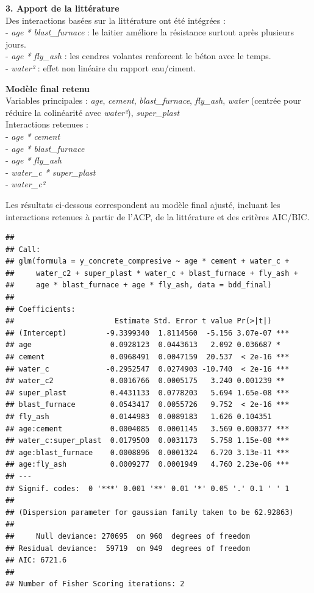 \documentclass[
  12pt,
]{article}
\begin{document}
\textbf{3. Apport de la littérature}\\
Des interactions basées sur la littérature ont été intégrées :\\
- \emph{age * blast\_furnace} : le laitier améliore la résistance
surtout après plusieurs jours.\\
- \emph{age * fly\_ash} : les cendres volantes renforcent le béton avec
le temps.\\
- \emph{water²} : effet non linéaire du rapport eau/ciment.

\textbf{Modèle final retenu}\\
Variables principales : \emph{age}, \emph{cement},
\emph{blast\_furnace}, \emph{fly\_ash}, \emph{water} (centrée pour
réduire la colinéarité avec \emph{water²}), \emph{super\_plast}\\
Interactions retenues :\\
- \emph{age * cement}\\
- \emph{age * blast\_furnace}\\
- \emph{age * fly\_ash}\\
- \emph{water\_c * super\_plast}\\
- \emph{water\_c²}

Les résultats ci-dessous correspondent au modèle final ajusté, incluant
les interactions retenues à partir de l'ACP, de la littérature et des
critères AIC/BIC.

\begin{verbatim}
## 
## Call:
## glm(formula = y_concrete_compresive ~ age * cement + water_c + 
##     water_c2 + super_plast * water_c + blast_furnace + fly_ash + 
##     age * blast_furnace + age * fly_ash, data = bdd_final)
## 
## Coefficients:
##                       Estimate Std. Error t value Pr(>|t|)    
## (Intercept)         -9.3399340  1.8114560  -5.156 3.07e-07 ***
## age                  0.0928123  0.0443613   2.092 0.036687 *  
## cement               0.0968491  0.0047159  20.537  < 2e-16 ***
## water_c             -0.2952547  0.0274903 -10.740  < 2e-16 ***
## water_c2             0.0016766  0.0005175   3.240 0.001239 ** 
## super_plast          0.4431133  0.0778203   5.694 1.65e-08 ***
## blast_furnace        0.0543417  0.0055726   9.752  < 2e-16 ***
## fly_ash              0.0144983  0.0089183   1.626 0.104351    
## age:cement           0.0004085  0.0001145   3.569 0.000377 ***
## water_c:super_plast  0.0179500  0.0031173   5.758 1.15e-08 ***
## age:blast_furnace    0.0008896  0.0001324   6.720 3.13e-11 ***
## age:fly_ash          0.0009277  0.0001949   4.760 2.23e-06 ***
## ---
## Signif. codes:  0 '***' 0.001 '**' 0.01 '*' 0.05 '.' 0.1 ' ' 1
## 
## (Dispersion parameter for gaussian family taken to be 62.92863)
## 
##     Null deviance: 270695  on 960  degrees of freedom
## Residual deviance:  59719  on 949  degrees of freedom
## AIC: 6721.6
## 
## Number of Fisher Scoring iterations: 2
\end{verbatim}
\end{document}
